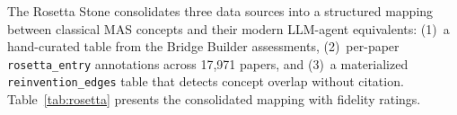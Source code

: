 \documentclass{article}
\begin{document}
%
%
%
%

The Rosetta Stone consolidates three data sources into a structured mapping between
classical MAS concepts and their modern LLM-agent equivalents: (1)~a hand-curated table
from the Bridge Builder assessments, (2)~per-paper \texttt{rosetta\_entry} annotations
across 17,971 papers, and (3)~a materialized \texttt{reinvention\_edges} table that
detects concept overlap without citation. Table~\ref{tab:rosetta} presents the
consolidated mapping with fidelity ratings.
\end{document}
